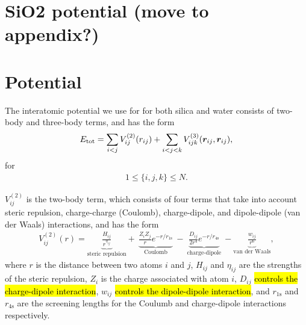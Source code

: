 \section{SiO2 potential (move to appendix?)}





\section{Potential}


The interatomic potential\cite{vashishta1990interaction}  we use for for both silica and water consists of two-body and three-body terms, and has the form
\begin{align*}
    E_\text{tot} = \sum_{i<j} V_{ij}^{(2)}(r_{ij}) + \sum_{i<j<k}V_{ijk}^{(3)}(\boldsymbol{r}_{ij},\boldsymbol{r}_{ij}),
\end{align*}
for
\begin{align*}
    1\leq \{i,j,k\} \leq N.
\end{align*}


$V_{ij}^{(2)}$ is the two-body term, which consists of four terms that take into account steric repulsion, charge-charge (Coulomb), charge-dipole, and dipole-dipole (van der Waals) interactions, and has the form
\begin{align*}
    V_{ij}^{(2)} (r) = 
    \underbrace{
        \frac{H_{ij}}{r^{\eta_{ij}}}
    }_{\text{steric repulsion}}
    +~ 
    \underbrace{
        \frac{Z_iZ_j}{r}e^{-r/r_{1\text{s}}}
    }_{\text{Coulomb}}
    ~-~
    \underbrace{
        \frac{D_{ij}}{2r^4}e^{-r/r_{4\text{s}}}
    }_{\text{charge-dipole}}
    ~- 
    \underbrace{
        \frac{w_{ij}}{r^6}
    }_{\text{van der Waals}}
    ,
\end{align*}
where $r$ is the distance between two atoms $i$ and $j$, $H_{ij}$ and $\eta_{ij}$ are the strengths of the steric repulsion, $Z_i$ is the charge associated with atom $i$, $D_{ij}$ \hl{controls the charge-dipole interaction}, $w_{ij}$ \hl{controls the dipole-dipole interaction}, and $r_{1\text{s}}$ and $r_{4\text{s}}$ are the screening lengths for the Coulumb and charge-dipole interactions respectively. 

